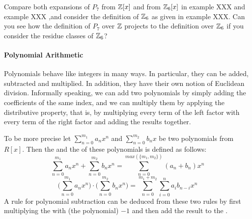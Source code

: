 \begin{exercise}
Compare both expansions of $P_7$ from $\mathbb{Z}[x]$ and from $\mathbb{Z}_6[x]$ in example XXX and example XXX ,and consider the definition of $\mathbb{Z}_6$ as given in example XXX. Can you see how the definition of $P_7$ over $\mathbb{Z}$ projects to the definition over $\mathbb{Z}_6$ if you consider the residue classes of $\mathbb{Z}_6$?
\end{exercise}
\paragraph{Polynomial Arithmetic}
Polynomials behave like integers in many ways. In particular, they can be added, subtracted and multiplied. In addition, they have their own notion of Euclidean division. Informally speaking, we can add two polynomials  by simply adding the coefficients of the same index, and we can multiply them by applying the distributive property, that is, by multiplying every term of the left factor with every term of the right factor and adding the results together.

To be more precise let $ \sum _{n = 0} ^{m_1}{a} _{n}{x} ^{n} $ and
$ \sum _{n = 0} ^{m_2}{b} _{n}{x} $ be two polynomials from $ R[x]$. Then the  and the  of these polynomials is defined as follows:
\begin{equation}
\sum _{n = 0} ^{m_1}{a} _{n}{x} ^{n} + \sum _{n = 0} ^{m_2}{b} _{n}{x } ^{n} = \sum _{n = 0} ^{max(\{m_1,m_2\})}{({a} _{n} +{b} _{n})}{x} ^{n}
\end{equation}
\begin{equation}
\bigg (\sum _{n = 0} ^{m_1}{a} _{n}{x} ^{n} \bigg) \cdot \bigg (\sum _{n = 0} ^{m_2 }{b} _{n}{x} ^{n} \bigg) = \sum _{n = 0} ^{m_1+m_2} \sum _{i = 0} ^{n}{a} _{i }{{b} _{n-i}}{x} ^{n}
\end{equation}
A rule for polynomial subtraction can be deduced from these two rules by first multiplying the \href{https://www.splashlearn.com/math-vocabulary/subtraction/subtrahend}{} 
with (the polynomial) $-1$ and then add the result to the \href{https://www.splashlearn.com/math-vocabulary/subtraction/minuend}{}.

